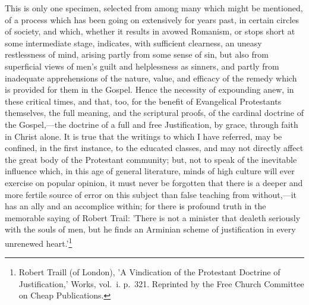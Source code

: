 \documentclass[
]{book}
\begin{document}
This is only one specimen, selected from among many which might be mentioned, of a process which has been going on extensively for years past, in certain circles of society, and which, whether it results in avowed Romanism, or stops short at some intermediate stage, indicates, with sufficient clearness, an uneasy restlessness of mind, arising partly from some sense of sin, but also from superficial views of men's guilt and helplessness as sinners, and partly from inadequate apprehensions of the nature, value, and efficacy of the remedy which is provided for them in the Gospel. Hence the necessity of expounding anew, in these critical times, and that, too, for the benefit of Evangelical Protestants themselves, the full meaning, and the scriptural proofs, of the cardinal doctrine of the Gospel,---the doctrine of a full and free Justification, by grace, through faith in Christ alone. It is true that the writings to which I have referred, may be confined, in the first instance, to the educated classes, and may not directly affect the great body of the Protestant community; but, not to speak of the inevitable influence which, in this age of general literature, minds of high culture will ever exercise on popular opinion, it must never be forgotten that there is a deeper and more fertile source of error on this subject than false teaching from without,---it has an ally and an accomplice within; for there is profound truth in the memorable saying of Robert Trail: 'There is not a minister that dealeth seriously with the souls of men, but he finds an Arminian scheme of justification in every unrenewed heart.'\footnote{Robert Traill (of London), 'A Vindication of the Protestant Doctrine of Justification,' Works, vol.~i. p.~321. Reprinted by the Free Church Committee on Cheap Publications.}
\end{document}
